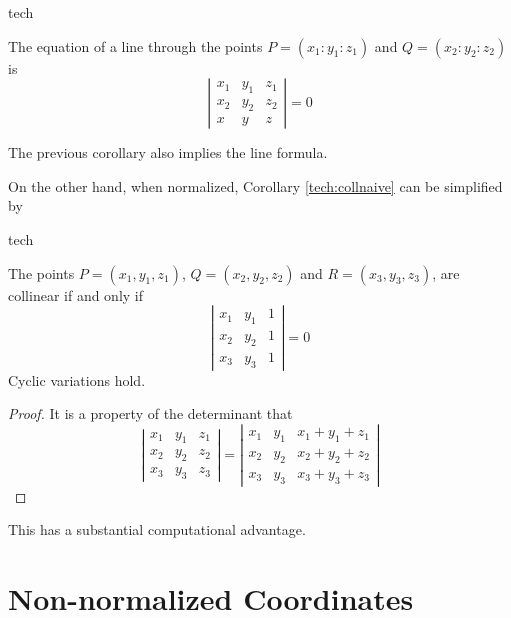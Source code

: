 \begin{StoreCode}{tech}
\begin{corollary}
  \label{tech:line2pt}
  The equation of a line through the points $P=(x_1:y_1:z_1)$ and $Q=(x_2:y_2:z_2)$ is
  \[ \left| \begin{array}{ccc} x_1 & y_1 & z_1 \\ x_2 & y_2 & z_2 \\ x & y & z \end{array} \right| = 0\]
\end{corollary}
\end{StoreCode}
The previous corollary also implies the line formula.

On the other hand, when normalized, Corollary \ref{tech:collnaive} can be simplified by
\begin{StoreCode}{tech}
\begin{corollary}
  \label{tech:coll}
  The points $P=(x_1,y_1,z_1)$, $Q=(x_2,y_2,z_2)$ and $R=(x_3,y_3,z_3)$, %
  are collinear if and only if
  \[ \left| \begin{array}{ccc} x_1 & y_1 & 1 \\ x_2 & y_2 & 1 \\ x_3 & y_3 & 1 \end{array} \right| = 0\]
  Cyclic variations hold.
\end{corollary}
\end{StoreCode}
\begin{proof}
  It is a property of the determinant that
  \[ \left| \begin{array}{ccc} x_1 & y_1 & z_1 \\ x_2 & y_2 & z_2 \\ x_3 & y_3 & z_3 \end{array} \right| = \left| \begin{array}{ccc} x_1 & y_1 & x_1+y_1+z_1 \\ x_2 & y_2 & x_2+y_2+z_2 \\ x_3 & y_3 & x_3+y_3+z_3 \end{array} \right|\]
\end{proof}

This has a substantial computational advantage.




\section{Non-normalized Coordinates}
\label{sec:notnormal}

